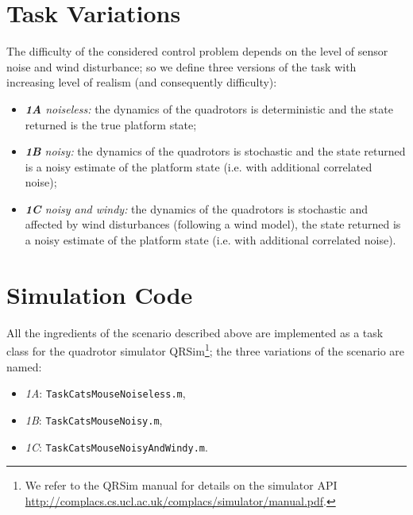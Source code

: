\documentclass[a4paper,11pt]{report}
\newcommand{\sname}{QRSim\xspace}
\newcommand{\webman}{\url{http://complacs.cs.ucl.ac.uk/complacs/simulator/manual.pdf}\xspace}
\newcommand\mytexttt[1]{\texttt{\hyphenchar\font=45\relax #1}}
\begin{document}
\section{Task Variations} \label{CatMouseVariations}
The difficulty of the considered control problem depends on the level of sensor noise and wind disturbance; so we define three versions of the task with increasing level of realism (and consequently difficulty):
\begin{itemize}
 \item \textit{\textbf{1A} noiseless:} the dynamics of the quadrotors is deterministic and the state returned is the true platform state;
 \item \textit{\textbf{1B} noisy:} the dynamics of the quadrotors is stochastic and the state returned is a noisy estimate of the platform state (i.e. with additional correlated noise);
 \item \textit{\textbf{1C} noisy and windy:} the dynamics of the quadrotors is stochastic and affected by wind disturbances (following a wind model), the state returned is a noisy estimate of the platform state (i.e. with additional correlated noise).
\end{itemize}


\section{Simulation Code}\label{CatMouseSim}
All the ingredients of the scenario described above are implemented as a task class for the quadrotor simulator \sname\footnote{We refer to the \sname manual for details on the simulator API \webman.}; the three variations of the scenario are named:
\begin{itemize}
\item\textit{1A}: \mytexttt{TaskCatsMouseNoiseless.m},
\item\textit{1B}: \mytexttt{TaskCatsMouseNoisy.m},
\item\textit{1C}: \mytexttt{TaskCatsMouseNoisyAndWindy.m}. 
\end{itemize}
\end{document}
